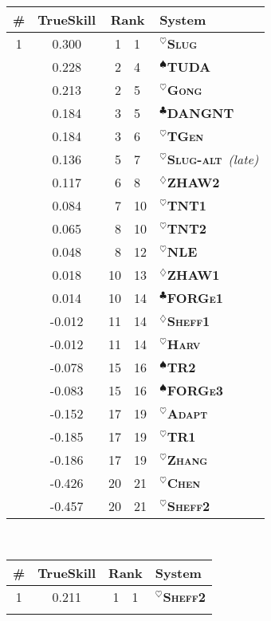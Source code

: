 \documentclass[11pt,a4paper]{article}
\newcommand\tgen{\textsc{TGen}\xspace}
\newcommand\slug{\textsc{Slug}\xspace}
\newcommand\slugalt{\textsc{Slug-alt}\xspace}
\newcommand\tntnlgi{\textsc{TNT1}\xspace}
\newcommand\tntnlgii{\textsc{TNT2}\xspace}
\newcommand\zhawi{\textsc{ZHAW1}\xspace}
\newcommand\zhawii{\textsc{ZHAW2}\xspace}
\newcommand\adapt{\textsc{Adapt}\xspace}
\newcommand\dangnt{\textsc{DANGNT}\xspace}
\newcommand\forgei{\textsc{FORGe1}\xspace}
\newcommand\forgeiii{\textsc{FORGe3}\xspace}
\newcommand\gong{\textsc{Gong}\xspace}
\newcommand\harv{\textsc{Harv}\xspace}
\newcommand\nle{\textsc{NLE}\xspace}
\newcommand\sheffi{\textsc{Sheff1}\xspace}
\newcommand\sheffii{\textsc{Sheff2}\xspace}
\newcommand\chen{\textsc{Chen}\xspace}
\newcommand\thomsoni{\textsc{TR1}\xspace}
\newcommand\thomsonii{\textsc{TR2}\xspace}
\newcommand\tuda{\textsc{TUDA}\xspace}
\newcommand\zhang{\textsc{Zhang}\xspace}
\newcommand{\symbseq}{$^\heartsuit$}
\newcommand{\symbdd}{$^\diamondsuit$}
\newcommand{\symbrule}{$^\clubsuit$}
\newcommand{\symbtempl}{$^\spadesuit$}
\newcommand\Ctgen{\textcolor{seqtoseq}{\symbseq\bf \tgen}}
\newcommand\Cslug{\textcolor{seqtoseq}{\symbseq\bf \slug}}
\newcommand\Cslugalt{\textcolor{seqtoseq}{\symbseq\bf \slugalt}}
\newcommand\Ctntnlgi{\textcolor{seqtoseq}{\symbseq\bf \tntnlgi}}
\newcommand\Ctntnlgii{\textcolor{seqtoseq}{\symbseq\bf \tntnlgii}}
\newcommand\Czhawi{\textcolor{datadriven}{\symbdd\bf \zhawi}}
\newcommand\Czhawii{\textcolor{datadriven}{\symbdd\bf \zhawii}}
\newcommand\Cadapt{\textcolor{seqtoseq}{\symbseq\bf \adapt}}
\newcommand\Cdangnt{\textcolor{rules}{\symbrule\bf \dangnt}}
\newcommand\Cforgei{\textcolor{rules}{\symbrule\bf \forgei}}
\newcommand\Cforgeiii{\textcolor{templates}{\symbtempl\bf \forgeiii}}
\newcommand\Cgong{\textcolor{seqtoseq}{\symbseq\bf \gong}}
\newcommand\Charv{\textcolor{seqtoseq}{\symbseq\bf \harv}}
\newcommand\Cnle{\textcolor{seqtoseq}{\symbseq\bf \nle}}
\newcommand\Csheffi{\textcolor{datadriven}{\symbdd\bf \sheffi}}
\newcommand\Csheffii{\textcolor{seqtoseq}{\symbseq\bf \sheffii}}
\newcommand\Cchen{\textcolor{seqtoseq}{\symbseq\bf \chen}}
\newcommand\Cthomsoni{\textcolor{seqtoseq}{\symbseq\bf \thomsoni}}
\newcommand\Cthomsonii{\textcolor{templates}{\symbtempl\bf \thomsonii}}
\newcommand\Ctuda{\textcolor{templates}{\symbtempl\bf \tuda}}
\newcommand\Czhang{\textcolor{seqtoseq}{\symbseq\bf \zhang}}
\begin{document}
\begin{table*}[tp]
\begin{center}
\scriptsize
\setlength{\extrarowheight}{2pt}
\
\begin{tabular}{ccr@{--}ll}
\bf \#  & \bf TrueSkill  & \multicolumn{2}{c}{\bf Rank}  & \bf System \\\hline\hline
1  & \phantom{-}0.300  & 1 & 1  & \Cslug \\\hdashline[0.5pt/2pt]
\multirow{13}{*}{2}  & \phantom{-}0.228  & 2 & 4  & \Ctuda \\
& \phantom{-}0.213  & 2 & 5  & \Cgong \\
& \phantom{-}0.184  & 3 & 5  & \Cdangnt \\
& \phantom{-}0.184  & 3 & 6  & \Ctgen \\
& \phantom{-}0.136  & 5 & 7  & \Cslugalt~\emph{(late)} \\
& \phantom{-}0.117  & 6 & 8  & \Czhawii \\
& \phantom{-}0.084  & 7 & 10  & \Ctntnlgi \\
& \phantom{-}0.065  & 8 & 10  & \Ctntnlgii \\
& \phantom{-}0.048  & 8 & 12  & \Cnle \\
& \phantom{-}0.018  & 10 & 13  & \Czhawi \\
& \phantom{-}0.014  & 10 & 14  & \Cforgei \\
& -0.012  & 11 & 14  & \Csheffi \\
& -0.012  & 11 & 14  & \Charv \\\hdashline[0.5pt/2pt]
\multirow{2}{*}{3}  & -0.078  & 15 & 16  & \Cthomsonii \\
& -0.083  & 15 & 16  & \Cforgeiii \\\hdashline[0.5pt/2pt]
\multirow{3}{*}{4}  & -0.152  & 17 & 19  & \Cadapt \\
& -0.185  & 17 & 19  & \Cthomsoni \\
& -0.186  & 17 & 19  & \Czhang \\\hdashline[0.5pt/2pt]
\multirow{2}{*}{5}  & -0.426  & 20 & 21  & \Cchen \\
& -0.457  & 20 & 21  & \Csheffii \\
\end{tabular}
\qquad\qquad
{}
\  
\begin{tabular}{ccr@{--}ll}
\bf \#  & \bf TrueSkill  & \multicolumn{2}{c}{\bf Rank}  & \bf System \\\hline\hline
1  & \phantom{-}0.211  & 1 & 1  & \Csheffii \\\hdashline[0.5pt/2pt]

\end{tabular}
\end{center}
\end{table*}
\end{document}
